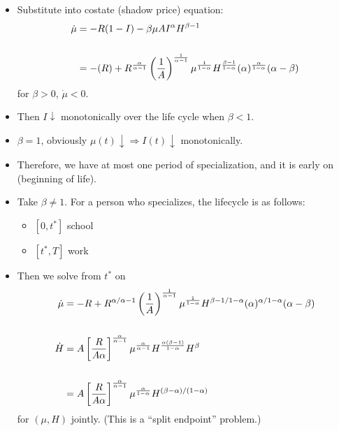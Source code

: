 \documentclass[12pt,compress,handout]{beamer}  %
\begin{document}
\begin{frame}
\begin{itemize}[<+->]
\item
Substitute into costate (shadow price) equation:
\begin{align*}
\dot{\mu} &= -R(1-I)-\beta \mu AI^{\alpha }H^{\beta -1}\\
\\
&= -(R)+R^{\frac{\alpha }{\alpha -1}}\left( \frac{1}{A}\right) ^{\frac{1}{%
\alpha -1}}\mu ^{\frac{1}{1-\alpha }}H^{\frac{\beta -1}{1-\alpha
}}(\alpha )^{\frac{\alpha }{1-\alpha }}(\alpha -\beta )
\end{align*}
for $\beta >0$, $\dot{\mu}<0$. \medskip

\item
Then $I\downarrow $ monotonically over the life cycle when $\beta
<1$. \medskip

\item
$\beta =1$, obviously $\mu(t) \downarrow \Rightarrow I(t) \downarrow
$ monotonically. \medskip

\item
Therefore, we have at most one period of specialization, and it is
early on (beginning of life).
\end{itemize}
\end{frame}


\begin{frame}
\begin{itemize}[<+->]
\item
Take $\beta \neq 1$. For a person who specializes, the lifecycle is
as follows:
    \begin{itemize}[<+->]
    \item
    $[0,t^{*}]$ school

    \item
    $[t^{*},T]$ work
    \end{itemize}
\medskip

\item
Then we solve from $t^{*}$ on
\begin{align*}
\dot{\mu} &= -R+R^{\alpha /\alpha -1}\left( \frac{1}{A}\right)
^{\frac{1}{\alpha -1}}\mu ^{\frac{1}{1-\alpha }}H^{\beta -1/1-\alpha
}(\alpha )^{\alpha /1-\alpha }(\alpha -\beta ) \\
\\
\dot{H} &= A\left[ \frac{R}{A\alpha }\right] ^{\frac{\alpha }{%
\alpha -1}}\mu ^{\frac{\alpha }{\alpha -1}}H^{\frac{\alpha (\beta -1)}{%
1-\alpha }}H^{\beta } \\
\\
&= A\left[ \frac{R}{A\alpha }\right] ^{\frac{\alpha }{\alpha -1}}\mu ^{\frac{%
\alpha }{1-\alpha }}H^{(\beta -\alpha )/(1-\alpha )}
\end{align*}
for $(\mu ,H)$ jointly. (This is a ``split endpoint'' problem.)
\end{itemize}
\end{frame}
\end{document}
